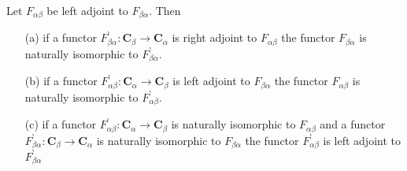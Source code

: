 \begin{thm}
\label{thm:adjointuniq}
Let $F_{\alpha\beta}$ be left adjoint to $F_{\beta\alpha}$. Then
\begin{enumerate}
\item[(a)]
if a functor $F_{\beta\alpha}^{\backprime} \colon \mathbf{C}_{\beta} \rightarrow \mathbf{C}_{\alpha}$ is right adjoint to $F_{\alpha\beta}$ the functor $F_{\beta\alpha}$ is naturally isomorphic to $F_{\beta\alpha}^{\backprime}$.
\item[(b)]
if a functor $F_{\alpha\beta}^{\backprime} \colon \mathbf{C}_{\alpha} \rightarrow \mathbf{C}_{\beta}$ is left adjoint to $F_{\beta\alpha}$ the functor $F_{\alpha\beta}$ is naturally isomorphic to $F_{\alpha\beta}^{\backprime}$.
\item[(c)]
if a functor $F_{\alpha\beta}^{\backprime} \colon \mathbf{C}_{\alpha} \rightarrow \mathbf{C}_{\beta}$ is naturally isomorphic to $F_{\alpha\beta}$ and a functor $F_{\beta\alpha}^{\backprime} \colon \mathbf{C}_{\beta} \rightarrow \mathbf{C}_{\alpha}$ is naturally isomorphic to $F_{\beta\alpha}$ the functor $F_{\alpha\beta}^{\backprime}$ is left adjoint to $F_{\beta\alpha}^{\backprime}$
\end{enumerate}
\end{thm}
